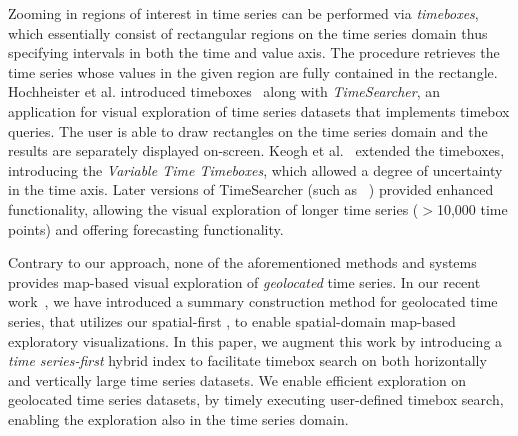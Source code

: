 Zooming in regions of interest in time series can be performed via {\em timeboxes}, which essentially consist of rectangular regions on the time series domain thus specifying intervals in both the time and value axis. The procedure retrieves the time series whose values in the given region are fully contained in the rectangle. Hochheister et al. introduced timeboxes~\cite{hochheiser2004dynamic} along with {\em TimeSearcher}, an application for visual exploration of time series datasets that implements timebox queries. The user is able to draw rectangles on the time series domain and the results are separately displayed on-screen. Keogh et al.~\cite{keogh2002augmented} extended the timeboxes, introducing the {\em Variable Time Timeboxes}, which allowed a degree of uncertainty in the time axis. Later versions of TimeSearcher (such as ~\cite{aris2005representing}) provided enhanced functionality, allowing the visual exploration of longer time series ($>$10,000 time points) and offering forecasting functionality.

Contrary to our approach, none of the aforementioned methods and systems provides map-based visual exploration of {\em geolocated} time series. In our recent work~\cite{chatzigeorgakidis2018map}, we have introduced a summary construction method for geolocated time series, that utilizes our spatial-first \btsr, to enable spatial-domain map-based exploratory visualizations. In this paper, we augment this work by introducing a {\em time series-first} hybrid index to facilitate timebox search on both horizontally and vertically large time series datasets. We enable efficient exploration on geolocated time series datasets, by timely executing user-defined timebox search, enabling the exploration also in the time series domain.